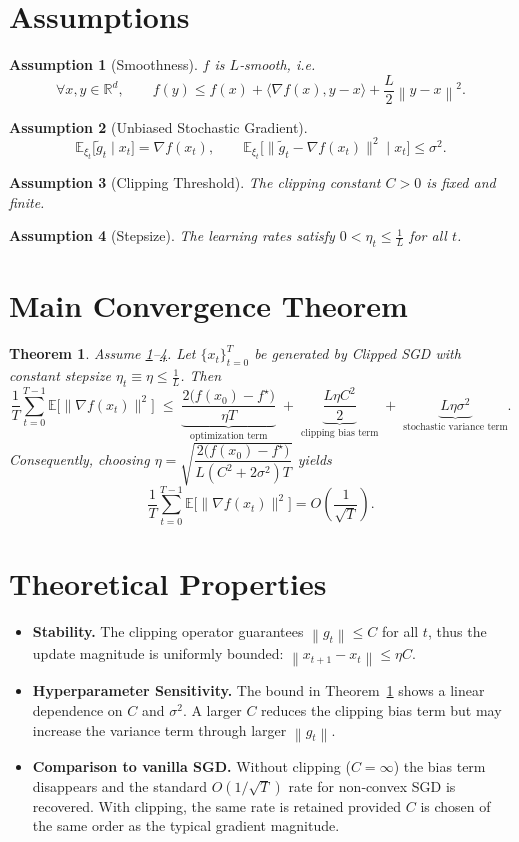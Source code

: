 \documentclass{article}
\newtheorem{theorem}{Theorem}
\newtheorem{assumption}{Assumption}
\newcommand{\EE}{\mathbb{E}}
\newcommand{\norm}[1]{\left\lVert#1\right\rVert}
\begin{document}
\newpage
\section*{Assumptions}
\begin{assumption}[Smoothness]\label{ass:smooth}
$f$ is $L$‑smooth, i.e.
\[
\forall x,y\in\mathbb{R}^d,\qquad
f(y)\le f(x)+\langle\nabla f(x),y-x\rangle+\frac{L}{2}\norm{y-x}^2 .
\]
\end{assumption}
\begin{assumption}[Unbiased Stochastic Gradient]\label{ass:unbiased}
\[
\EE_{\xi_t}\!\big[\tilde g_t\mid x_t\big]=\nabla f(x_t),\qquad
\EE_{\xi_t}\!\big[\|\tilde g_t-\nabla f(x_t)\|^2\mid x_t\big]\le\sigma^2 .
\]
\end{assumption}
\begin{assumption}[Clipping Threshold]\label{ass:threshold}
The clipping constant $C>0$ is fixed and finite.
\end{assumption}
\begin{assumption}[Stepsize]\label{ass:stepsize}
The learning rates satisfy $0<\eta_t\le \frac{1}{L}$ for all $t$.
\end{assumption}

\section*{Main Convergence Theorem}
\begin{theorem}\label{thm:main}
Assume \ref{ass:smooth}–\ref{ass:stepsize}. Let $\{x_t\}_{t=0}^{T}$ be generated by Clipped SGD with constant stepsize $\eta_t\equiv\eta\le \frac1L$. Then
\[
\frac{1}{T}\sum_{t=0}^{T-1}\EE\!\big[\|\nabla f(x_t)\|^2\big]
\;\le\;
\underbrace{\frac{2\big(f(x_0)-f^\star\big)}{\eta T}}_{\text{optimization term}}
\;+\;
\underbrace{\frac{L\eta C^2}{2}}_{\text{clipping bias term}}
\;+\;
\underbrace{L\eta\sigma^2}_{\text{stochastic variance term}} .
\]
Consequently, choosing $\eta=\sqrt{\dfrac{2\big(f(x_0)-f^\star\big)}{L(C^2+2\sigma^2)T}}$ yields
\[
\frac{1}{T}\sum_{t=0}^{T-1}\EE\!\big[\|\nabla f(x_t)\|^2\big]
=O\!\left(\frac{1}{\sqrt{T}}\right).
\]
\end{theorem}

\section*{Theoretical Properties}
\begin{itemize}
\item \textbf{Stability.} The clipping operator guarantees $\norm{g_t}\le C$ for all $t$, thus the update magnitude is uniformly bounded: $\norm{x_{t+1}-x_t}\le\eta C$.
\item \textbf{Hyperparameter Sensitivity.} The bound in Theorem~\ref{thm:main} shows a linear dependence on $C$ and $\sigma^2$. A larger $C$ reduces the clipping bias term but may increase the variance term through larger $\norm{g_t}$.
\item \textbf{Comparison to vanilla SGD.} Without clipping ($C=\infty$) the bias term disappears and the standard $O(1/\sqrt{T})$ rate for non‑convex SGD is recovered. With clipping, the same rate is retained provided $C$ is chosen of the same order as the typical gradient magnitude.
\end{itemize}
\end{document}
